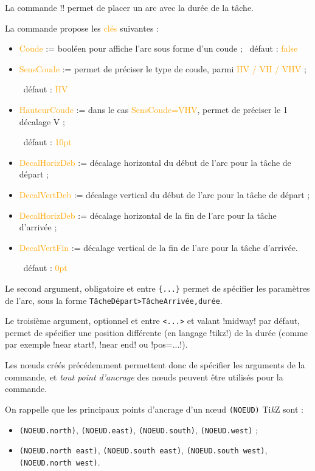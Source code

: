 \documentclass[french,a4paper,11pt]{article}
\providecommand\tikzlogo{Ti\textit{k}Z}
\let\TikZ\tikzlogo
\newcommand\Cle[1]{{\small\sffamily\textlangle \textcolor{orange}{#1}\textrangle}}
\begin{document}
\begin{tipblock}
La commande \motcletex!\MPMPlaceDuree! permet de placer un arc avec la durée de la tâche.

\smallskip

La commande propose les \Cle{clés} suivantes :

\begin{itemize}
	\item \Cle{Coude} := booléen pour affiche l'arc sous forme d'un coude ; \hfill~défaut : \Cle{false}
	\item \Cle{SensCoude} := permet de préciser le type de coude, parmi \Cle{HV / VH / VHV} ;
	
	\hfill~défaut : \Cle{HV}
	\item \Cle{HauteurCoude} := dans le cas \Cle{SensCoude=VHV}, permet de préciser le 1\ier{} décalage V ;
	
	\hfill~défaut : \Cle{10pt}
	\item \Cle{DecalHorizDeb} := décalage horizontal du début de l'arc pour la tâche de départ ;
	\item \Cle{DecalVertDeb} := décalage vertical du début de l'arc pour la tâche de départ ;
	\item \Cle{DecalHorizDeb} := décalage horizontal de la fin de l'arc pour la tâche d'arrivée ;
	\item \Cle{DecalVertFin} := décalage vertical de la fin de l'arc pour la tâche d'arrivée.
	
	\hfill~défaut : \Cle{0pt}
\end{itemize}

Le second argument, obligatoire et entre \texttt{\{...\}} permet de spécifier les paramètres de l'arc, sous la forme \verb!TâcheDépart>TâcheArrivée,durée!.

\smallskip

Le troisième argument, optionnel et entre \texttt{<...>} et valant \motcletex!midway! par défaut, permet de spécifier une position différente (en langage \packagetex!tikz!) de la durée (comme par exemple \motcletex!near start!, \motcletex!near end! ou \motcletex!pos=...!).
\end{tipblock}

\begin{noteblock}
Les nœuds créés précédemment permettent donc de spécifier les arguments de la commande, et \textit{tout point d'ancrage} des nœuds peuvent être utilisés pour la commande.

\smallskip

On rappelle que les principaux points d'ancrage d'un nœud \verb!(NOEUD)! \TikZ{} sont :

\begin{itemize}[leftmargin=*]
	\item {\small \verb!(NOEUD.north)!}, {\small \verb!(NOEUD.east)!}, {\small \verb!(NOEUD.south)!}, {\small \verb!(NOEUD.west)!} ;
	\item {\small \verb!(NOEUD.north east)!}, {\small \verb!(NOEUD.south east)!}, {\small \verb!(NOEUD.south west)!}, {\small \verb!(NOEUD.north west)!}.
\end{itemize}
\vspace*{-\baselineskip}\leavevmode
\end{noteblock}
\end{document}
